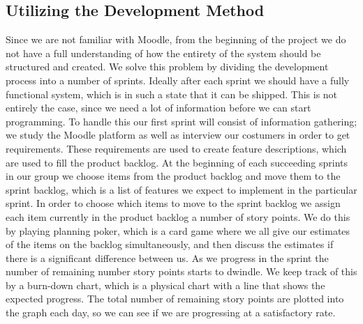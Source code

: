 \subsection{Utilizing the Development Method} %
Since we are not familiar with Moodle, from the beginning of the project we do not have a full understanding of how the entirety of the system should be structured and created.
We solve this problem by dividing the development process into a number of sprints.
Ideally after each sprint we should have a fully functional system, which is in such a state that it can be shipped.
This is not entirely the case, since we need a lot of information before we can start programming.
To handle this our first sprint will consist of information gathering; we study the Moodle platform as well as interview our costumers in order to get requirements.
These requirements are used to create feature descriptions, which are used to fill the product backlog.
At the beginning of each succeeding sprints in our group we choose items from the product backlog and move them to the sprint backlog, which is a list of features we expect to implement in the particular sprint.
In order to choose which items to move to the sprint backlog we assign each item currently in the product backlog a number of story points.
We do this by playing planning poker, which is a card game where we all give our estimates of the items on the backlog simultaneously, and then discuss the estimates if there is a significant difference between us.
As we progress in the sprint the number of remaining number story points starts to dwindle. 
We keep track of this by a burn-down chart, which is a physical chart with a line that shows the expected progress.
The total number of remaining story points are plotted into the graph each day, so we can see if we are progressing at a satisfactory rate.


